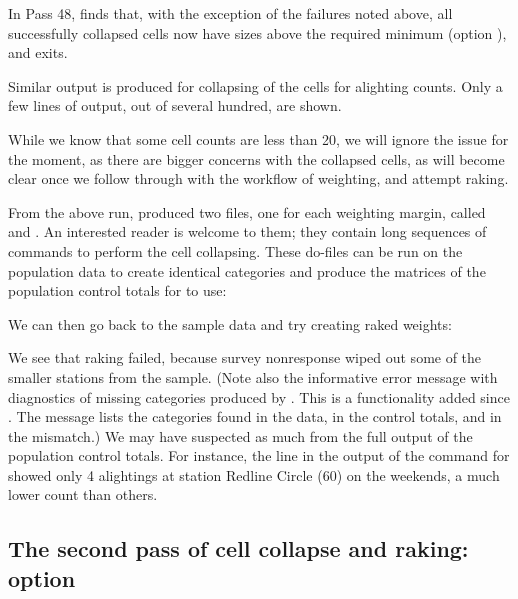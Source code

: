 In Pass 48,  finds that, with the exception of the failures noted above,
all successfully collapsed cells now have sizes above the required minimum (option ),
and exits.

Similar output is produced for collapsing of the cells for alighting counts. Only a few lines
of output, out of several hundred, are shown.

While we know that some cell counts are less than 20, we will ignore the issue
for the moment, as there are bigger concerns with the collapsed cells,
as will become clear once we follow through with the workflow of weighting,
and attempt raking.

From the above run,  produced two files, one for each
weighting margin, called  and . An interested reader
is welcome to  them; they contain long sequences of 
commands to perform the cell collapsing. These do-files
can be run on the population data to create identical categories and produce
the matrices of the population control totals for  to use:

\noindent
\begin{stlog}
\nullskip
\end{stlog}

\bigskip

We can then go back to the sample data and try creating raked weights:

\begin{stlog}
\nullskip
\end{stlog}

We see that raking failed, because survey nonresponse wiped out some of the smaller
stations from the sample. (Note also the informative error message with
diagnostics of missing categories produced by . This is a functionality
added since \citet{kolenikov:2014}. The message lists
the categories found in the data, in the control totals, and in the mismatch.)
We may have suspected
as much from the full output of the population control totals. For instance, 
the line in the output of the  command
for  showed only 4 alightings at station Redline Circle (60)
on the weekends, a much lower count than others.

\subsection{The second pass of cell collapse and raking:  option}

